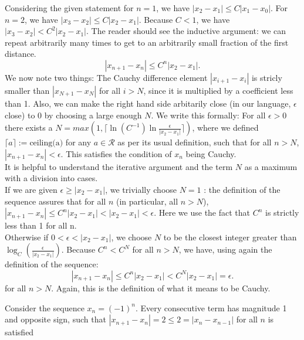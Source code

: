 \documentclass[11 pt]{article}
\begin{document}
\begin{solution}
	Considering the given statement for $n=1$, we have $|x_2-x_1|\leq C|x_1-x_0|$. For  $n=2$, we have  $|x_3-x_2|\leq C|x_2-x_1|$. Because  $C<1$, we have $|x_3-x_2|<C^2|x_2-x_1|$. The reader should see the inductive argument: we can repeat arbitrarily many times to get to an arbitrarily small fraction of the first distance.
	\[
	|x_{n+1}-x_n|\leq C^n|x_2-x_1|
	.\] 
	We now note two things: The Cauchy difference element $|x_{i+1}-x_i|$ is stricly smaller than $|x_{N+1}-x_N|$ for all $i>N$, since it is multiplied by a coefficient less than 1. 
	Also, we can make the right hand side arbitarily close (in our language, $\epsilon$ close) to 0 by choosing a large enough $N$. We write this formally:
	For all $\epsilon>0$ there exists a $N=max(1,\lceil\ln(C^{-1})\ln{\frac{\epsilon}{|x_2-x_1|}}\rceil)$, where we defined $\lceil a \rceil := \text{ceiling(a)}$ for any $a\in\mathcal{R}$ as per its usual definition, such that for all $n>N$,  $|x_{n+1}-x_n|<\epsilon$. This satisfies the condition of $x_n$ being Cauchy.\\
	It is helpful to understand the iterative argument and the term $N$ as a maximum with a division into cases.\\
	If we are given $\epsilon\geq|x_2-x_1|$, we trivially choose $N=1$ : the definition of the sequence assures that for all $n$ (in particular, all $n>N$),  $|x _{n+1}-x_n|\leq C^n|x_{2}-x_1|<|x_2-x_1|<\epsilon$. Here we use the fact that $C^n$ is strictly less than 1 for all n.\\
	Otherwise if $0<\epsilon<|x_2-x_1|$, we choose $N$ to be the closest integer greater than $\log_C(\frac{\epsilon}{|x_2-x_1|})$.
	Because $C^n<C^N$ for all  $n>N$, we have, using again the definition of the sequence:
	\[
	|x_{n+1}-x_n|\leq C^{n}|x_2-x_1|< C^N|x_2-x_1|=\epsilon
	.\] for all $n>N$. Again, this is the definition of what it means to be Cauchy.
\end{solution}
\begin{solution}
	Consider the sequence $x_n=(-1)^n$. Every consecutive term has magnitude 1 and opposite sign, such that $|x_{n+1}-x_n|=2\leq2=|x_{n}-x_{n-1}|$ for all $n$ is satisfied
\end{solution}
\end{document}
